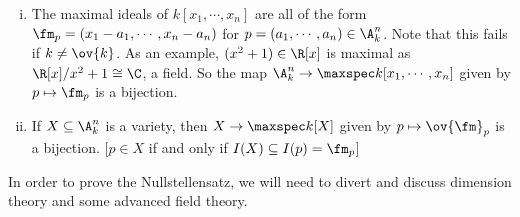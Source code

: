 \begin{enumerate}[(i)]
\item The maximal ideals of $k[x_1,\cdots,x_n]$ are all of the form $\fm_p=(x_1-a_1,\cdots,x_n-a_n)$ for $p=(a_1,\cdots,a_n) \in \A_k^n$. Note that this fails if $k \neq \ov{k}$. As an example, $(x^2+1) \in \R[x]$ is maximal as $\R[x]/x^2+1 \cong \C$, a field. So the map $\A_k^n \to \maxspec k[x_1,\cdots,x_n]$ given by $p \mapsto \fm_p$ is a bijection. 

\item If $X \subseteq \A_k^n$ is a variety, then $X \to \maxspec k[X]$ given by $p \mapsto \ov{\fm}_p$ is a bijection. [$p \in X$ if and only if $I(X) \subseteq I(p)=\fm_p$]

\end{enumerate}

In order to prove the Nullstellensatz, we will need to divert and discuss dimension theory and some advanced field theory. 